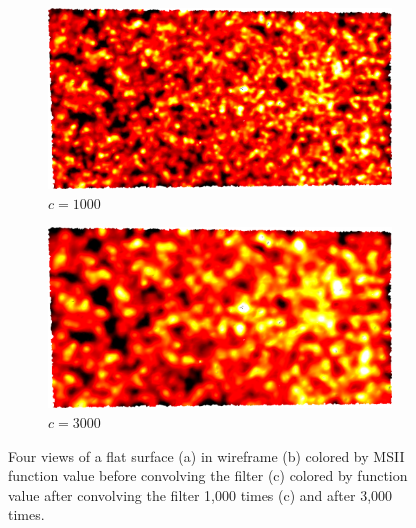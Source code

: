 \begin{figure}[ht]
	\bigskip
	\begin{subfigure}[b]{0.49\linewidth}
		\includegraphics[width=\linewidth]
		{data/acquired_meshes/ILATO_1A_SM2066-HE5-60_070214_merged_GMO_r1_n4_v256_funcvals_1000iter.png}
		\caption{$c=1000$}\label{fig:ILATO.c}
	\end{subfigure}
	\begin{subfigure}[b]{0.49\linewidth}
		\includegraphics[width=\linewidth]
		{data/acquired_meshes/ILATO_1A_SM2066-HE5-60_070214_merged_GMO_r1_n4_v256_funcvals_3000iter.png}
		\caption{$c=3000$}\label{fig:ILATO.d}
	\end{subfigure}
	\caption[Four views of a flat surface]{Four views of a flat surface (a) in wireframe (b) colored by MSII function value before convolving the filter (c) colored by function value after convolving the filter 1,000 times (c) and after 3,000 times.}
	\label{fig:ILATO}
\end{figure}
